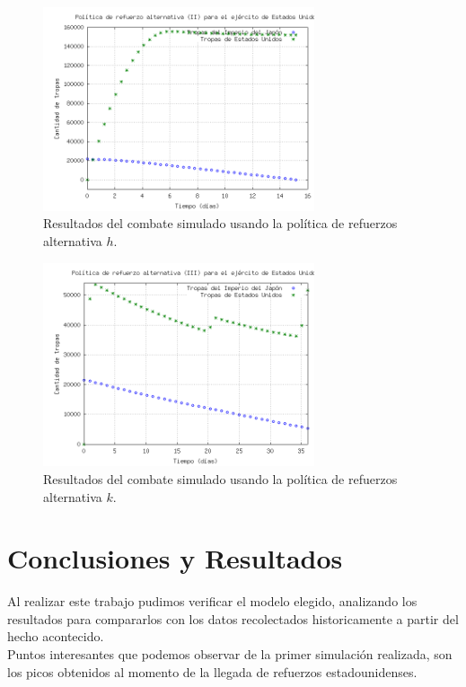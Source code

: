 \documentclass{sig-alternate}
\begin{document}
\begin{figure}[h]
\begin{center}
\includegraphics[width=8cm]{reinforce3.png}
\caption{\label{fig:reinforce3}Resultados del combate simulado usando la política de refuerzos alternativa $h$.}
\end{center}
\end{figure}


\begin{figure}[h]
\begin{center}
\includegraphics[clip, width=8cm]{reinforce4.png}
\caption{\label{fig:reinforce4}Resultados del combate simulado usando la política de refuerzos alternativa $k$.}
\end{center}
\end{figure}

\newpage

\section{Conclusiones y Resultados}
\label{sec:conclusiones}

Al realizar este trabajo pudimos verificar el modelo elegido, analizando los resultados para compararlos con los datos recolectados historicamente
a partir del hecho acontecido. \\
Puntos interesantes que podemos observar de la primer simulación realizada, son los picos obtenidos al momento de la llegada de refuerzos
estadounidenses.
\end{document}

